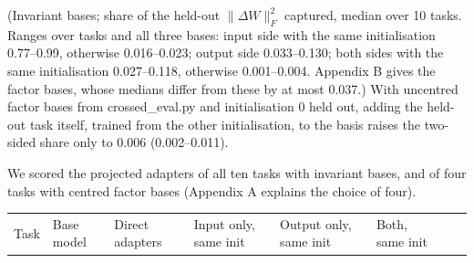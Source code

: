 \documentclass[
  11pt,
]{article}
\newcounter{none} %
\begin{document}
(Invariant bases; share of the held-out \(\|\Delta W\|_F^2\) captured,
median over 10 tasks. Ranges over tasks and all three bases: input side
with the same initialisation 0.77--0.99, otherwise 0.016--0.023; output
side 0.033--0.130; both sides with the same initialisation 0.027--0.118,
otherwise 0.001--0.004. Appendix B gives the factor bases, whose medians
differ from these by at most 0.037.) With uncentred factor bases from
crossed\_eval.py and initialisation 0 held out, adding the held-out task
itself, trained from the other initialisation, to the basis raises the
two-sided share only to 0.006 (0.002--0.011).

We scored the projected adapters of all ten tasks with invariant bases,
and of four tasks with centred factor bases (Appendix A explains the
choice of four).

{\def\LTcaptype{none} %
\begin{longtable}[]{@{}
  >{\raggedright\arraybackslash}p{}
  >{\raggedright\arraybackslash}p{}
  >{\raggedright\arraybackslash}p{}
  >{\raggedright\arraybackslash}p{}
  >{\raggedright\arraybackslash}p{}
  >{\raggedright\arraybackslash}p{}
  >{\raggedright\arraybackslash}p{}
  >{\raggedright\arraybackslash}p{}@{}}
\toprule\noalign{}
\begin{minipage}[b]{\linewidth}\raggedright
Task
\end{minipage} & \begin{minipage}[b]{\linewidth}\raggedright
Base model
\end{minipage} & \begin{minipage}[b]{\linewidth}\raggedright
Direct adapters
\end{minipage} & \begin{minipage}[b]{\linewidth}\raggedright
Input only, same init
\end{minipage} & \begin{minipage}[b]{\linewidth}\raggedright
Output only, same init
\end{minipage} & \begin{minipage}[b]{\linewidth}\raggedright
Both, same init
\end{minipage} & \begin{minipage}[b]{\linewidth}\raggedright

\end{minipage}
\end{longtable}}
\end{document}
